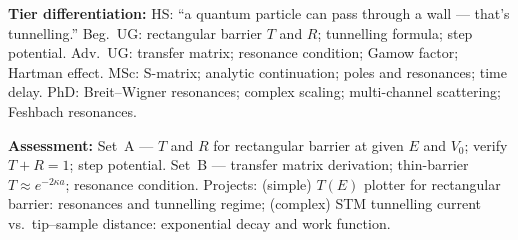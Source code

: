 \documentclass[11pt,a4paper]{article}
\begin{document}
\begin{tcolorbox}[modulebox, title={Module~I.4 / L10: Scattering from a Potential Barrier}]
\medskip\textbf{Tier differentiation:}
HS: ``a quantum particle can pass through a wall --- that's tunnelling.''
Beg.\ UG: rectangular barrier $T$ and $R$; tunnelling formula; step potential.
Adv.\ UG: transfer matrix; resonance condition; Gamow factor; Hartman effect.
MSc: S-matrix; analytic continuation; poles and resonances; time delay.
PhD: Breit--Wigner resonances; complex scaling; multi-channel scattering; Feshbach resonances.

\medskip\textbf{Assessment:}
Set~A --- $T$ and $R$ for rectangular barrier at given $E$ and $V_0$; verify $T+R=1$; step potential.
Set~B --- transfer matrix derivation; thin-barrier $T\approx e^{-2\kappa a}$; resonance condition.
Projects: (simple) $T(E)$ plotter for rectangular barrier: resonances and tunnelling regime;
(complex) STM tunnelling current vs.\ tip--sample distance: exponential decay and work function.
\end{tcolorbox}

\medskip
\end{document}
